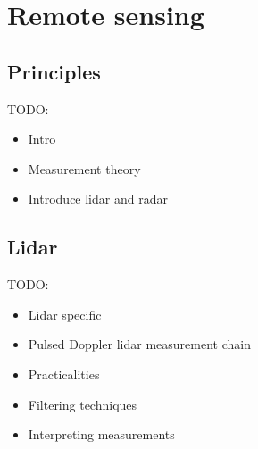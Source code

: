 


\clearpage
\section{Remote sensing}
\label{intro_remote_sensing}

\subsection{Principles}
\label{sec:intro_rs_principles}

TODO:
\begin{itemize}
\color{red}
    \item Intro
    \item Measurement theory
    \item Introduce lidar and radar
\end{itemize}


\clearpage
\subsection{Lidar}
\label{sec:intro_lidar}

TODO:
\begin{itemize}
\color{red}
    \item Lidar specific 
    \item Pulsed Doppler lidar measurement chain
    \item Practicalities
    \item Filtering techniques
    \item Interpreting measurements
\end{itemize}


\clearpage
